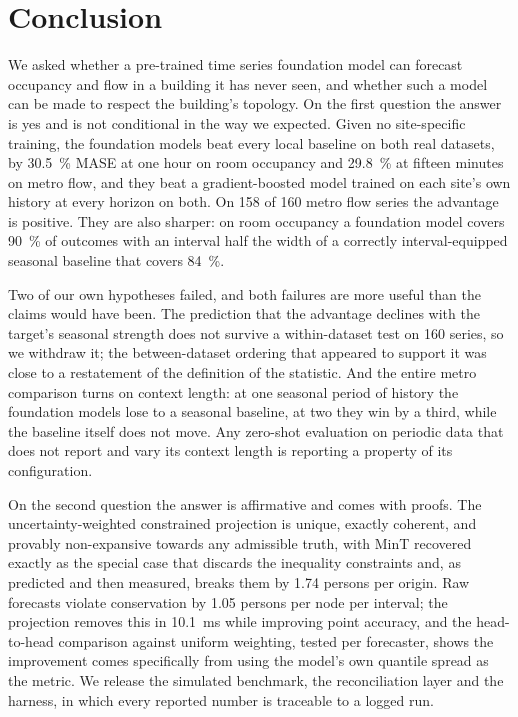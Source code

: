 \documentclass[11pt]{article}
\theoremstyle{plain}
\theoremstyle{definition}
\theoremstyle{remark}
\begin{document}
\section{Conclusion}

We asked whether a pre-trained time series foundation model can forecast occupancy and flow in a building it has never seen, and whether such a model can be made to respect the building's topology. On the first question the answer is yes and is not conditional in the way we expected. Given no site-specific training, the foundation models beat every local baseline on both real datasets, by \SI{30.5}{\percent} MASE at one hour on room occupancy and \SI{29.8}{\percent} at fifteen minutes on metro flow, and they beat a gradient-boosted model trained on each site's own history at every horizon on both. On \num{158} of \num{160} metro flow series the advantage is positive. They are also sharper: on room occupancy a foundation model covers \SI{90}{\percent} of outcomes with an interval half the width of a correctly interval-equipped seasonal baseline that covers \SI{84}{\percent}.

Two of our own hypotheses failed, and both failures are more useful than the claims would have been. The prediction that the advantage declines with the target's seasonal strength does not survive a within-dataset test on \num{160} series, so we withdraw it; the between-dataset ordering that appeared to support it was close to a restatement of the definition of the statistic. And the entire metro comparison turns on context length: at one seasonal period of history the foundation models lose to a seasonal baseline, at two they win by a third, while the baseline itself does not move. Any zero-shot evaluation on periodic data that does not report and vary its context length is reporting a property of its configuration.

On the second question the answer is affirmative and comes with proofs. The uncertainty-weighted constrained projection is unique, exactly coherent, and provably non-expansive towards any admissible truth, with MinT recovered exactly as the special case that discards the inequality constraints and, as predicted and then measured, breaks them by \num{1.74} persons per origin. Raw forecasts violate conservation by \num{1.05} persons per node per interval; the projection removes this in \SI{10.1}{\milli\second} while improving point accuracy, and the head-to-head comparison against uniform weighting, tested per forecaster, shows the improvement comes specifically from using the model's own quantile spread as the metric. We release the simulated benchmark, the reconciliation layer and the harness, in which every reported number is traceable to a logged run.
\end{document}
